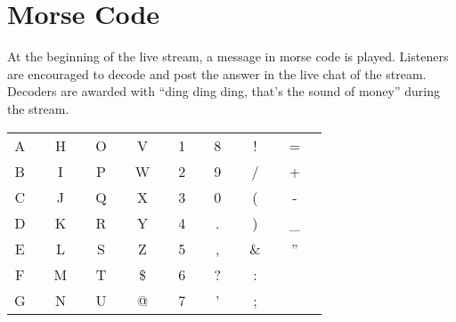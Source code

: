 \section{Morse Code}
At the beginning of the live stream, a message in morse
code is played. Listeners
are encouraged to decode and post the answer in the live chat of the stream.
Decoders are awarded with ``ding ding ding, that's the sound of money''
during the stream.

\def\mdot{\textbullet}
\def\mdash{\textendash}

\begin{center}
\begin{tabular}{c l | c l | c l | c l | c l | c l | c l | c l}
A & \mdot \mdash
  & H & \mdot \mdot \mdot \mdot 
  & O & \mdash \mdash \mdash       
  & V & \mdot \mdot \mdot \mdash  
  & 1 & \mdot \mdash \mdash \mdash \mdash       
  & 8 & \mdash \mdash \mdash \mdot \mdot       
  & ! & \mdash \mdot \mdash \mdot \mdash \mdash 
  & = & \mdash \mdot \mdot \mdot \mdash \\
B & \mdash \mdot \mdot \mdot
  & I & \mdot \mdot
  & P & \mdot \mdash \mdash \mdot  
  & W & \mdot \mdash \mdash        
  & 2 & \mdot \mdot \mdash \mdash \mdash
  & 9 & \mdash \mdash \mdash \mdash \mdot      
  & / & \mdash \mdot \mdot \mdash \mdash
  & + & \mdot \mdash \mdot \mdash \mdot      \\ 
C & \mdash \mdot \mdash \mdot
  & J & \mdot \mdash \mdash \mdash 
  & Q & \mdash \mdash \mdot \mdash 
  & X & \mdash \mdot \mdot \mdash  
  & 3 & \mdot \mdot \mdot \mdash \mdash 
  & 0 & \mdash \mdash \mdash \mdash \mdash     
  & ( & \mdash \mdot \mdash \mdash \mdot
  & - & \mdash \mdot \mdot \mdot \mdot \mdash  \\ 
D & \mdash \mdot \mdot         
  & K & \mdash \mdot \mdash 
  & R & \mdot \mdash \mdot         
  & Y & \mdash \mdot \mdash \mdash
  & 4 & \mdot \mdot \mdot \mdot \mdash          
  & . & \mdot \mdash \mdot \mdash \mdot \mdash 
  & ) & \mdash \mdot \mdash \mdash \mdot \mdash
  & \_ & \mdot \mdot \mdash \mdash \mdot \mdash \\
E & \mdot                  
  & L & \mdot \mdash \mdot \mdot
  & S & \mdot \mdot \mdot        
  & Z & \mdash \mdash \mdot \mdot 
  & 5 & \mdot \mdot \mdot \mdot \mdot           
  & , & \mdash \mdash \mdot \mdot \mdash \mdash 
  & \& & \mdot \mdash \mdot \mdot \mdot
  & '' & \mdot \mdash \mdot \mdot \mdash \mdot    \\
F & \mdot \mdash \mdot \mdot 
  & M & \mdash \mdash 
  & T & \mdash                     
  & \$ & \mdot \mdot \mdot \mdash \mdot \mdot \mdash
  & 6 & \mdash \mdot \mdot \mdot \mdot          
  & ? & \mdot \mdot \mdash \mdash \mdot \mdot  
  & : & \mdash \mdash \mdash \mdot \mdot \mdot \\
G & \mdash \mdash \mdot 
  & N & \mdash \mdot               
  & U & \mdot \mdot \mdash         
  & @ & \mdot \mdash \mdash \mdot \mdash \mdot
  & 7 & \mdash \mdash \mdot \mdot \mdot         
  & ' & \mdot \mdash \mdash \mdash \mdash \mdot
  & ; & \mdash \mdot \mdash \mdot \mdash \mdot \\
\end{tabular}
\end{center}
